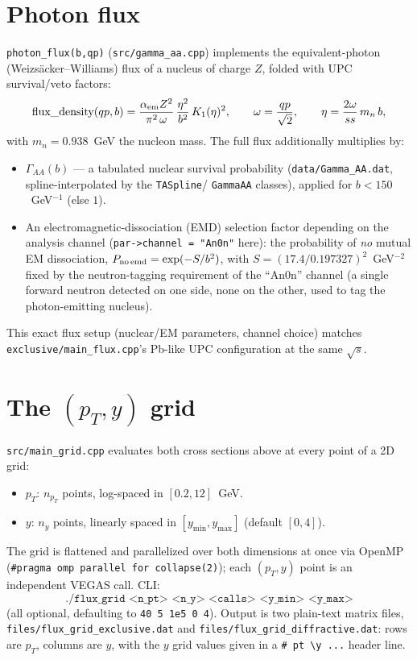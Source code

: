 \documentclass[11pt]{article}
\begin{document}
\section{Photon flux}
\label{sec:flux}

\texttt{photon\_flux(b,qp)} (\texttt{src/gamma\_aa.cpp}) implements the
equivalent-photon (Weizs\"acker--Williams) flux of a nucleus of charge $Z$,
folded with UPC survival/veto factors:
\[
\text{flux\_density}(qp,b) = \frac{\alpha_{\rm em} Z^2}{\pi^2\,\omega}\,
\frac{\eta^2}{b^2}\,K_1(\eta)^2, \qquad
\omega = \frac{qp}{\sqrt2}, \qquad
\eta = \frac{2\omega}{ss}\,m_n\,b,
\]
with $m_n=0.938$~GeV the nucleon mass. The full flux additionally
multiplies by:
\begin{itemize}
\item $\Gamma_{AA}(b)$ — a tabulated nuclear survival probability
(\texttt{data/Gamma\_AA.dat}, spline-interpolated by the \texttt{TASpline}/
\texttt{GammaAA} classes), applied for $b<150$~GeV$^{-1}$ (else $1$).
\item An electromagnetic-dissociation (EMD) selection factor depending on
the analysis channel (\texttt{par->channel = "An0n"} here): the
probability of \emph{no} mutual EM dissociation,
$P_{\rm no\,emd}=\exp(-S/b^2)$, with $S=(17.4/0.197327)^2$~GeV$^{-2}$ fixed
by the neutron-tagging requirement of the ``An0n'' channel (a single
forward neutron detected on one side, none on the other, used to tag
the photon-emitting nucleus).
\end{itemize}
This exact flux setup (nuclear/EM parameters, channel choice) matches
\texttt{exclusive/main\_flux.cpp}'s Pb-like UPC configuration at the same
$\sqrt s$.

\section{The $(p_T,y)$ grid}

\texttt{src/main\_grid.cpp} evaluates both cross sections above at every
point of a 2D grid:
\begin{itemize}
\item $p_T$: $n_{p_T}$ points, log-spaced in $[0.2,12]$~GeV.
\item $y$: $n_y$ points, linearly spaced in $[y_{\min},y_{\max}]$
(default $[0,4]$).
\end{itemize}
The grid is flattened and parallelized over both dimensions at once via
OpenMP (\texttt{\#pragma omp parallel for collapse(2)}); each $(p_T,y)$
point is an independent VEGAS call. CLI:
\[
\texttt{./flux\_grid <n\_pt> <n\_y> <calls> <y\_min> <y\_max>}
\]
(all optional, defaulting to \texttt{40 5 1e5 0 4}). Output is two plain-text
matrix files, \texttt{files/flux\_grid\_exclusive.dat} and
\texttt{files/flux\_grid\_diffractive.dat}: rows are $p_T$, columns are
$y$, with the $y$ grid values given in a
\texttt{\# pt \textbackslash y ...} header line.
\end{document}
